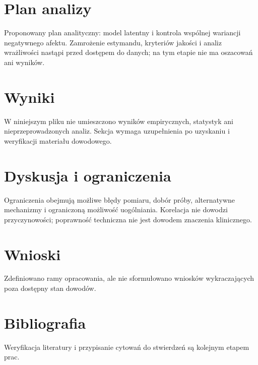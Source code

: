 \documentclass[11pt,a4paper]{article}
\begin{document}
\section{Plan analizy}

Proponowany plan analityczny: model latentny i kontrola wspólnej wariancji negatywnego afektu. Zamrożenie estymandu, kryteriów jakości i analiz wrażliwości nastąpi przed dostępem do danych; na tym etapie nie ma oszacowań ani wyników.

\section{Wyniki}

W niniejszym pliku nie umieszczono wyników empirycznych, statystyk ani nieprzeprowadzonych analiz. Sekcja wymaga uzupełnienia po uzyskaniu i weryfikacji materiału dowodowego.

\section{Dyskusja i ograniczenia}

Ograniczenia obejmują możliwe błędy pomiaru, dobór próby, alternatywne mechanizmy i ograniczoną możliwość uogólniania. Korelacja nie dowodzi przyczynowości; poprawność techniczna nie jest dowodem znaczenia klinicznego.

\section{Wnioski}

Zdefiniowano ramy opracowania, ale nie sformułowano wniosków wykraczających poza dostępny stan dowodów.

\section*{Bibliografia}

Weryfikacja literatury i przypisanie cytowań do stwierdzeń są kolejnym etapem prac.
\end{document}
